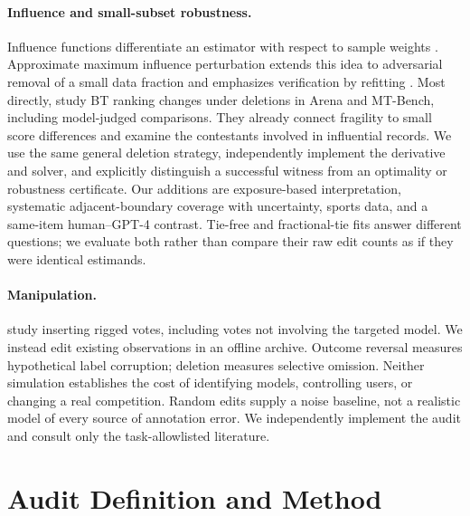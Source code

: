 \documentclass{article}
\begin{document}
\paragraph{Influence and small-subset robustness.}
Influence functions differentiate an estimator with respect to sample weights \citep{koh2017}. Approximate maximum influence perturbation extends this idea to adversarial removal of a small data fraction and emphasizes verification by refitting \citep{broderick2020}. Most directly, \citet{huang2025} study BT ranking changes under deletions in Arena and MT-Bench, including model-judged comparisons. They already connect fragility to small score differences and examine the contestants involved in influential records. We use the same general deletion strategy, independently implement the derivative and solver, and explicitly distinguish a successful witness from an optimality or robustness certificate. Our additions are exposure-based interpretation, systematic adjacent-boundary coverage with uncertainty, sports data, and a same-item human--GPT-4 contrast. Tie-free and fractional-tie fits answer different questions; we evaluate both rather than compare their raw edit counts as if they were identical estimands.

\paragraph{Manipulation.}
\citet{min2025} study inserting rigged votes, including votes not involving the targeted model. We instead edit existing observations in an offline archive. Outcome reversal measures hypothetical label corruption; deletion measures selective omission. Neither simulation establishes the cost of identifying models, controlling users, or changing a real competition. Random edits supply a noise baseline, not a realistic model of every source of annotation error. We independently implement the audit and consult only the task-allowlisted literature.

\section{Audit Definition and Method}
\end{document}
